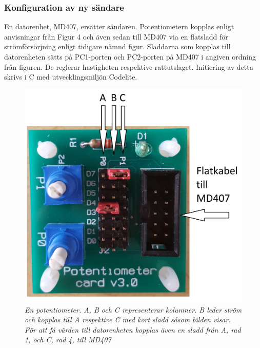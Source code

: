 \documentclass[a4paper]{article}
\begin{document}
\subsubsection{Konfiguration av ny sändare}
\vspace{5mm} \noindent
En datorenhet, MD407, ersätter sändaren. Potentiometern kopplas enligt anvisningar från Figur 4 och även sedan till MD407 via en flatsladd för strömförsörjning enligt tidigare nämnd figur. Sladdarna som kopplas till datorenheten sätts på PC1-porten och PC2-porten på MD407 i angiven ordning från figuren. De reglerar hastigheten respektive rattutslaget. Initiering av detta skrivs i C med utvecklingsmiljön Codelite.


\begin{figure}[H]
\includegraphics[scale=0.05]{PotentiometerMedRitning.jpg}
\centering
\caption{\it En potentiometer. A, B och C representerar kolumner. B leder ström och kopplas till A respektive C med kort sladd såsom bilden visar. För att få värden till datorenheten kopplas även en sladd från A, rad 1, och C, rad 4, till MD407}
\end{figure} 
\end{document}
